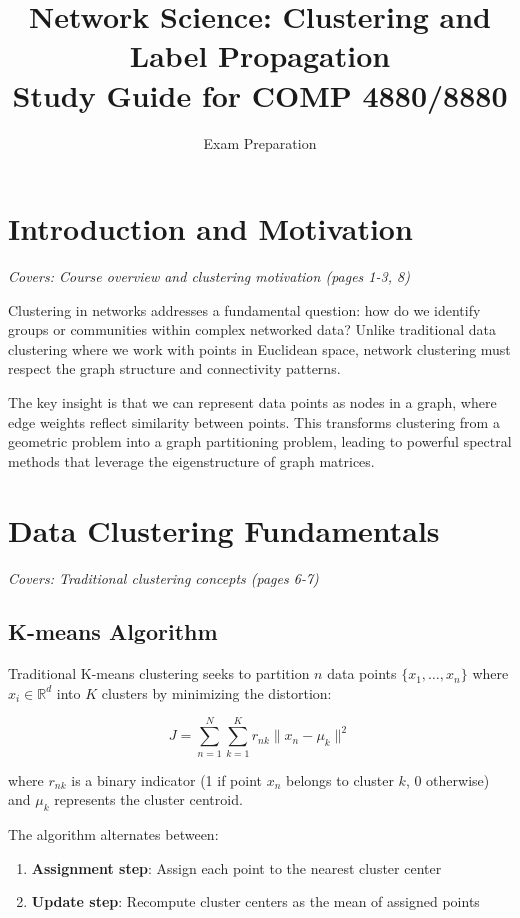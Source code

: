\documentclass[11pt]{article}
\title{Network Science: Clustering and Label Propagation\\Study Guide for COMP 4880/8880}
\author{Exam Preparation}
\date{}
\begin{document}
\maketitle

\section{Introduction and Motivation}
\textit{Covers: Course overview and clustering motivation (pages 1-3, 8)}

Clustering in networks addresses a fundamental question: how do we identify groups or communities within complex networked data? Unlike traditional data clustering where we work with points in Euclidean space, network clustering must respect the graph structure and connectivity patterns.

The key insight is that we can represent data points as nodes in a graph, where edge weights reflect similarity between points. This transforms clustering from a geometric problem into a graph partitioning problem, leading to powerful spectral methods that leverage the eigenstructure of graph matrices.

\section{Data Clustering Fundamentals}
\textit{Covers: Traditional clustering concepts (pages 6-7)}

\subsection{K-means Algorithm}
Traditional K-means clustering seeks to partition $n$ data points $\{x_1, \ldots, x_n\}$ where $x_i \in \mathbb{R}^d$ into $K$ clusters by minimizing the distortion:

$$J = \sum_{n=1}^N \sum_{k=1}^K r_{nk} \|x_n - \mu_k\|^2$$

where $r_{nk}$ is a binary indicator (1 if point $x_n$ belongs to cluster $k$, 0 otherwise) and $\mu_k$ represents the cluster centroid.

The algorithm alternates between:
\begin{enumerate}
\item \textbf{Assignment step}: Assign each point to the nearest cluster center
\item \textbf{Update step}: Recompute cluster centers as the mean of assigned points
\end{enumerate}
\end{document}

